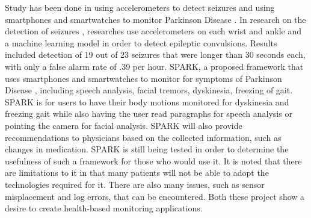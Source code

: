 Study has been done in using accelerometers to detect seizures \cite{Milosevic:2014} and using smartphones and smartwatches to monitor Parkinson Disease \cite{Sharma:2014}. In research on the detection of seizures \cite{Milosevic:2014}, researches use accelerometers on each wrist and ankle and a machine learning model in order to detect epileptic convulsions. Results included detection of 19 out of 23 seizures that were longer than 30 seconds each, with only a false alarm rate of .39 per hour. SPARK, a proposed framework that uses smartphones and smartwatches to monitor for symptoms of Parkinson Disease \cite{Sharma:2014}, including speech analysis, facial tremors, dyskinesia, freezing of gait. SPARK is for users to have their body motions monitored for dyskinesia and freezing gait while also having the user read paragraphs for speech analysis or pointing the camera for facial analysis. SPARK will also provide recommendations to physicians based on the collected information, such as changes in medication. SPARK is still being tested in order to determine the usefulness of such a framework for those who would use it. It is noted that there are limitations to it in that many patients will not be able to adopt the technologies required for it. There are also many issues, such as sensor misplacement and log errors, that can be encountered. Both these project show a desire to create health-based monitoring applications. 

